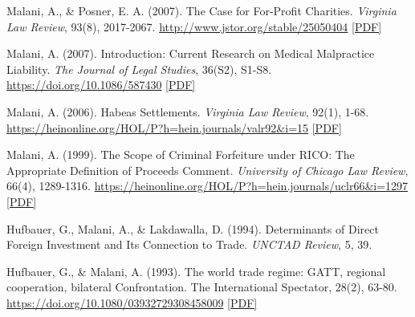 \begin{tablist}
        \item[2007] \tab{}Malani, A., \& Posner, E. A. (2007). The Case for For-Profit Charities. \textit{Virginia Law Review}, 93(8), 2017-2067. \href{http://www.jstor.org/stable/25050404}{http://www.jstor.org/stable/25050404} \href{https://github.com/anup-malani/website_personal/blob/main/publications/2007_Malani_CaseForForProfitCharities.pdf}{[PDF]}

        \item[2007] \tab{}Malani, A. (2007). Introduction: Current Research on Medical Malpractice Liability. \textit{The Journal of Legal Studies}, 36(S2), S1-S8. \href{https://doi.org/10.1086/587430}{https://doi.org/10.1086/587430}  \href{https://github.com/anup-malani/website_personal/blob/main/publications/2007_Malani_MedMalReview.pdf}{[PDF]}
    
        \item[2006] \tab{}Malani, A. (2006). Habeas Settlements. \textit{Virginia Law Review}, 92(1), 1-68. \href{https://heinonline.org/HOL/P?h=hein.journals/valr92&i=15}{https://heinonline.org/HOL/P?h=hein.journals/valr92\&i=15} \href{https://github.com/anup-malani/website_personal/blob/main/publications/2006_Malani_HabeasSettlements.pdf}{[PDF]}

        \item[1999] \tab{}Malani, A. (1999). The Scope of Criminal Forfeiture under RICO: The Appropriate Definition of Proceeds Comment. \textit{University of Chicago Law Review}, 66(4), 1289-1316. \href{https://heinonline.org/HOL/P?h=hein.journals/uclr66&i=1297}{https://heinonline.org/HOL/P?h=hein.journals/uclr66\&i=1297} \href{https://github.com/anup-malani/website_personal/blob/main/publications/1999_Malani_RICOForfeiture.pdf}{[PDF]}

        \item[1994] \tab{}Hufbauer, G., Malani, A., \& Lakdawalla, D. (1994). Determinants of Direct Foreign Investment and Its Connection to Trade. \textit{UNCTAD Review}, 5, 39.

        \item[1993] \tab{}Hufbauer, G., \& Malani, A. (1993). The world trade regime: GATT, regional cooperation, bilateral Confrontation. The International Spectator, 28(2), 63-80. \href{https://doi.org/10.1080/03932729308458009}{https://doi.org/10.1080/03932729308458009} \href{}{[PDF]} 
        
    \end{tablist}

